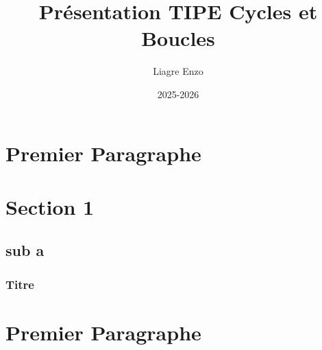 \documentclass[12pt]{beamer}
\title{Présentation TIPE Cycles et Boucles}
\author{Liagre Enzo}
\date{2025-2026}
\begin{document}
  \begin{frame}
    \section{Premier Paragraphe}
    \section{Section 1}
    \subsection{sub a}
    \tableofcontents
  \end{frame}

  \begin{frame}
    \frametitle{Titre}
    \section{Premier Paragraphe}
  \end{frame}

  
\end{document}
